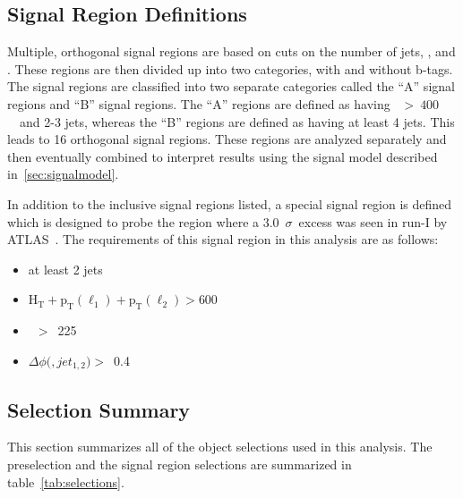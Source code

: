 \subsection{Signal Region Definitions}
\label{sec:SRs}
Multiple, orthogonal signal regions are based on cuts on the number of jets, \Ht, and \MET.
These regions are then divided up into two categories, with and without b-tags.
The signal regions are classified into two separate categories called the ``A'' signal regions and ``B'' signal regions.
The ``A'' regions are defined as having \Ht\ $>~400$~\gev\ and 2-3 jets,
whereas the ``B'' regions are defined as having at least 4 jets. 
This leads to 16 orthogonal signal regions.
These regions are analyzed separately and then eventually combined to interpret results using the signal model described in~\ref{sec:signalmodel}.

In addition to the inclusive signal regions listed, a special signal region is defined which is designed to probe the region where a 3.0~$\sigma$~excess was seen in run-I by ATLAS~\cite{ATLASZPAPER}.
The requirements of this signal region in this analysis are as follows:

\begin{itemize}
\item at least 2 jets
\item $\mathrm{H_{T}+p_{T}(\ell_1)+p_{T}(\ell_2) > }$600 \gev
\item \MET~$>$~225 \gev
\item $\Delta\phi($\MET$,jet_{1,2})>$~0.4
\end{itemize}

\subsection{Selection Summary}
\label{sec:selsummary}
This section summarizes all of the object selections used in this analysis.
The preselection and the signal region selections are summarized in table~\ref{tab:selections}.

